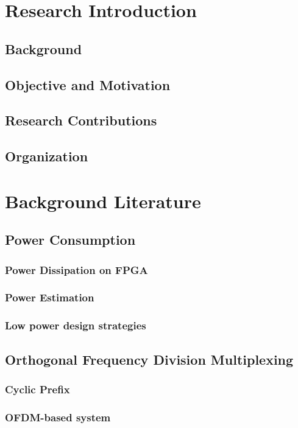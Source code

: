 \chapter{Research Introduction}
\label{chap:introduction}
	\section{Background}
	\section{Objective and Motivation}
	\section{Research Contributions}
	\section{Organization}
%
\chapter{Background Literature}
\label{chap:BackgroundLiterature}
	\section{Power Consumption}
		\subsection{Power Dissipation on FPGA}
		\subsection{Power Estimation}
		\subsection{Low power design strategies}
	\section{Orthogonal Frequency Division Multiplexing}
		\subsection{Cyclic Prefix}
		\subsection{OFDM-based system}

